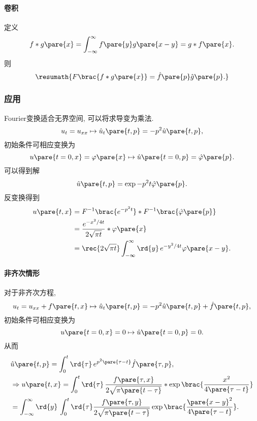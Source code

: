 \documentclass[hidelinks]{ctexart}
\begin{document}

\paragraph{卷积} %
\label{par:卷积}

定义
\[ f*g\pare{x} = \int_{-\infty}^\infty f\pare{y}g\pare{x-y} = g * f\pare{x}. \]
则
\[ \resumath{F\brac{f*g\pare{x}} = \hat f\pare{p}\hat g\pare{p}.} \]



\subsubsection{应用} %
\label{ssub:应用}

Fourier变换适合无界空间, 可以将求导变为乘法.
\[ u_t = u_{xx} \mapsto \hat u_t\pare{t,p} = -p^2 \hat u\pare{t,p}, \]
初始条件可相应变换为
\[ u\pare{t=0,x} = \varphi\pare{x} \mapsto \hat u\pare{t=0,p} = \hat \varphi\pare{p}. \]
可以得到解
\[ \hat u\pare{t,p} = \exp{-p^2 t}\hat \varphi\pare{p}. \]
反变换得到
\begin{align*}
    u\pare{t,x} &= F^{-1}\brac{e^{-p^2 t}} * F^{-1}\brac{\hat \varphi\pare{p}} \\
    &= \frac{e^{-x^2/4t}}{2\sqrt{\pi t}} * \varphi\pare{x} \\
    &= \rec{2\sqrt{\pi t}}\int_{-\infty}^{\infty} \rd{y}\, e^{-y^2/4t}\varphi\pare{x-y}.
\end{align*}

\paragraph{非齐次情形} %
\label{par:非齐次情形}

对于非齐次方程,
\[ u_t = u_{xx} + f\pare{t,x} \mapsto \hat u_t\pare{t,p} = -p^2 \hat u\pare{t,p} + \hat f\pare{t,p}, \]
初始条件可相应变换为
\[ u\pare{t=0,x} = 0 \mapsto \hat u\pare{t=0,p} = 0. \]
从而
\begin{align*}
    & \hat u\pare{t,p} = \int_0^t \rd{\tau}\, e^{p^2\pare{\tau - t}} \hat f\pare{\tau, p}, \\ 
    & \Rightarrow u\pare{t,x} = \int_0^t \rd{\tau}\, \frac{f\pare{\tau,x}}{2\sqrt{\pi \pare{t-\tau}}} * \exp\brac{\frac{x^2}{4\pare{\tau - t}}} \\
    & = \int_{-\infty}^\infty \rd{y}\,\int_0^t \rd{\tau} \frac{f\pare{\tau,y}}{2\sqrt{\pi\pare{t-\tau}}} \exp\brac{\frac{\pare{x-y}^2}{4\pare{\tau - t}}}.
\end{align*}
\end{document}
